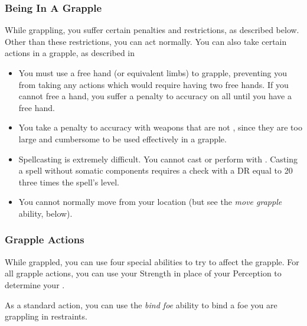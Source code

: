         \subsubsection{Being In A Grapple}
            While grappling, you suffer certain penalties and restrictions, as described below. Other than these restrictions, you can act normally. You can also take certain actions in a grapple, as described in 
            \begin{itemize}
                \item You must use a free hand (or equivalent limbs) to grapple, preventing you from taking any actions which would require having two free hands.
                    If you cannot free a hand, you suffer a  penalty to accuracy on all  until you have a free hand.
                \item You take a  penalty to accuracy with weapons that are not , since they are too large and cumbersome to be used effectively in a grapple.
                \item Spellcasting is extremely difficult. You cannot cast  or perform  with .
                    Casting a spell without somatic components requires a  check with a DR equal to 20 \add three times the spell's level.
                \item You cannot normally move from your location (but see the \textit{move grapple} ability, below).
            \end{itemize}

        \subsubsection{Grapple Actions}\label{Grapple Actions}
            While grappled, you can use four special abilities to try to affect the grapple.
            For all grapple actions, you can use your Strength in place of your Perception to determine your .

             As a standard action, you can use the \textit{bind foe} ability to bind a foe you are grappling in restraints.

